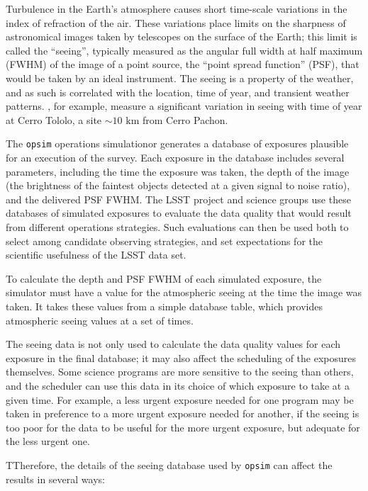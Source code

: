 \documentclass[\docopts]{\docclass}
\begin{document}
Turbulence in the Earth's atmosphere causes short time-scale variations
in the index of refraction of the air. These variations place limits
on the sharpness of astronomical images taken by telescopes on the
surface of the Earth; this limit is called the ``seeing'', typically
measured as the angular full width at half maximum (FWHM) of the image
of a point source, the ``point spread function'' (PSF), that would be
taken by an ideal instrument. The seeing is a property of the weather,
and as such is correlated with the location, time of year, and
transient weather patterns. \textcite{2009PASP..121..922E}, for example,
measure a significant variation in seeing with time of year at Cerro
Tololo, a site $\sim10 \mbox{ km}$ from Cerro Pachon.

The \texttt{opsim} operations simulationor generates a database of
exposures plausible for an execution of the survey. Each exposure in
the database includes several parameters, including the time the
exposure was taken, the depth of the image (the brightness of the
faintest objects detected at a given signal to noise ratio), and the
delivered PSF FWHM. The LSST project and science groups use these
databases of simulated exposures to evaluate the data quality that
would result from different operations strategies. Such evaluations
can then be used both to select among candidate observing strategies,
and set expectations for the scientific usefulness of the LSST data
set.

To calculate the depth and PSF FWHM of each simulated exposure, the
simulator must have a value for the atmospheric seeing at the time the
image was taken. It takes these values from a simple database table, which
provides atmospheric seeing values at a set of times.

The seeing data is not only used to calculate the data quality values
for each exposure in the final database; it may also affect the
scheduling of the exposures themselves. Some science programs are more
sensitive to the seeing than others, and the scheduler can
use this data in its choice of which exposure to take at a given
time. For example, a less urgent exposure needed for one program may
be taken in preference to a more urgent exposure needed for another,
if the seeing is too poor for the data to be useful for the more
urgent exposure, but adequate for the less urgent one.

TTherefore, the details of the seeing database used by \texttt{opsim}
can affect the results in several ways:
\end{document}
